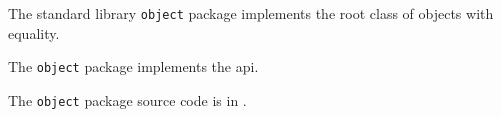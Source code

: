 
The standard library {\tt object} package implements the root class of objects with equality.

The {\tt object} package implements the  api.

The {\tt object} package source code is in .


